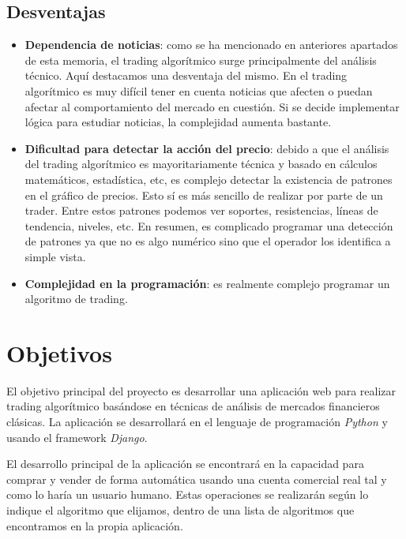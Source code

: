\subsection{Desventajas}

\begin{itemize}
	
	\item \textbf{Dependencia de noticias}: como se ha mencionado en anteriores apartados de esta memoria, el trading algorítmico surge principalmente del análisis técnico. Aquí destacamos una desventaja del mismo. En el trading algorítmico es muy difícil tener en cuenta noticias que afecten o puedan afectar al comportamiento del mercado en cuestión. Si se decide implementar lógica para estudiar noticias, la complejidad aumenta bastante.
	\item \textbf{Dificultad para detectar la acción del precio}: debido a que el análisis del trading algorítmico es mayoritariamente técnica y basado en cálculos matemáticos, estadística, etc, es complejo detectar la existencia de patrones en el gráfico de precios. Esto sí es más sencillo de realizar por parte de un trader. Entre estos patrones podemos ver soportes, resistencias, líneas de tendencia, niveles, etc. En resumen, es complicado programar una detección de patrones ya que no es algo numérico sino que el operador los identifica a simple vista.
	\item \textbf{Complejidad en la programación}: es realmente complejo programar un algoritmo de trading.
	
\end{itemize}
	

\section{Objetivos}

El objetivo principal del proyecto es desarrollar una aplicación web para realizar trading algorítmico basándose en técnicas de análisis de mercados financieros clásicas. La aplicación se desarrollará en el lenguaje de programación \textit{Python} y usando el framework \textit{Django}. \newline

El desarrollo principal de la aplicación se encontrará en la capacidad para comprar y vender de forma automática usando una cuenta comercial real tal y como lo haría un usuario humano. Estas operaciones se realizarán según lo indique el algoritmo que elijamos, dentro de una lista de algoritmos que encontramos en la propia aplicación. \newline

